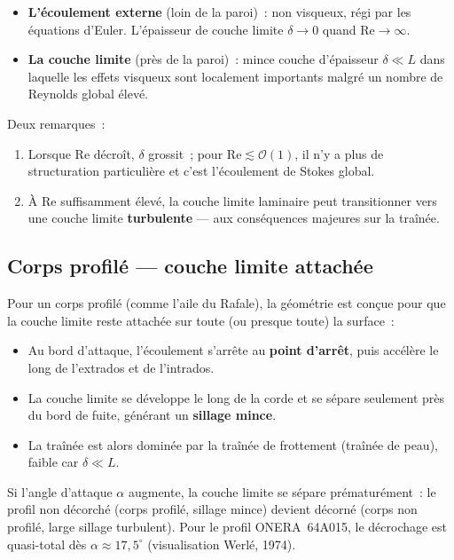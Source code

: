 \documentclass[11pt,a4paper]{report}
\begin{document}
\begin{itemize}
  \item \textbf{L'\'ecoulement externe} (loin de la paroi)~: non visqueux, r\'egi par
    les \'equations d'Euler. L'\'epaisseur de couche limite $\delta \to 0$ quand
    $\mathrm{Re}\to\infty$.
  \item \textbf{La couche limite} (pr\`es de la paroi)~: mince couche d'\'epaisseur
    $\delta \ll L$ dans laquelle les effets visqueux sont localement importants malgr\'e
    un nombre de Reynolds global \'elev\'e.
\end{itemize}

Deux remarques~:
\begin{enumerate}
  \item Lorsque $\mathrm{Re}$ d\'ecro\^it, $\delta$ grossit~; pour $\mathrm{Re}
    \lesssim \mathcal{O}(1)$, il n'y a plus de structuration particuli\`ere et c'est
    l'\'ecoulement de Stokes global.
  \item \`A $\mathrm{Re}$ suffisamment \'elev\'e, la couche limite laminaire peut
    transitionner vers une couche limite \textbf{turbulente} --- aux cons\'equences
    majeures sur la tra\^in\'ee.
\end{enumerate}

\subsection{Corps profil\'e --- couche limite attach\'ee}

Pour un corps profil\'e (comme l'aile du Rafale), la g\'eom\'etrie est con\c{c}ue pour
que la couche limite reste attach\'ee sur toute (ou presque toute) la surface~:

\begin{itemize}
  \item Au bord d'attaque, l'\'ecoulement s'arr\^ete au \textbf{point d'arr\^et}, puis
    acc\'el\`ere le long de l'extrados et de l'intrados.
  \item La couche limite se d\'eveloppe le long de la corde et se s\'epare seulement
    pr\`es du bord de fuite, g\'en\'erant un \textbf{sillage mince}.
  \item La tra\^in\'ee est alors domin\'ee par la tra\^in\'ee de frottement (tra\^in\'ee
    de peau), faible car $\delta \ll L$.
\end{itemize}

Si l'angle d'attaque $\alpha$ augmente, la couche limite se s\'epare pr\'ematur\'ement~:
le profil non d\'ecorch\'e (corps profil\'e, sillage mince) devient d\'ecorn\'e (corps
non profil\'e, large sillage turbulent). Pour le profil ONERA~64A015, le d\'ecrochage
est quasi-total d\`es $\alpha \approx 17{,}5^\circ$ (visualisation Werl\'e, 1974).
\end{document}
